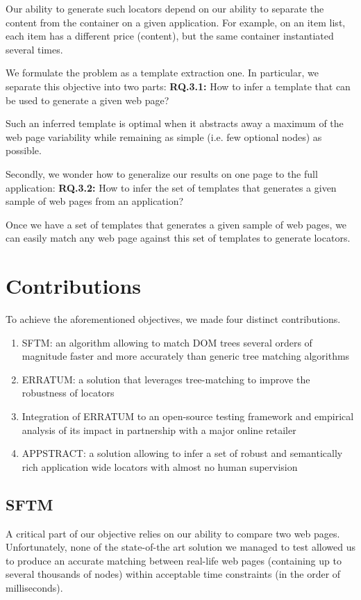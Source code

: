 Our ability to generate such locators depend on our ability to separate the content from the container on a given application. For example, on an item list, each item has a different price (content), but the same container instantiated several times.

We formulate the problem as a template extraction one.
In particular, we separate this objective into two parts:
\textbf{RQ.3.1:} How to infer a template that can be used to generate a given web page?

Such an inferred template is optimal when it abstracts away a maximum of the web page variability while remaining as simple (i.e. few optional nodes) as possible. 

Secondly, we wonder how to generalize our results on one page to the full application:
\textbf{RQ.3.2:} How to infer the set of templates that generates a given sample of web pages from an application?

Once we have a set of templates that generates a given sample of web pages, we can easily match any web page against this set of templates to generate locators.

\section{Contributions}
To achieve the aforementioned objectives, we made four distinct contributions.

\begin{enumerate}
\item SFTM: an algorithm allowing to match DOM trees several orders of magnitude faster and more accurately than generic tree matching algorithms
\item ERRATUM: a solution that leverages tree-matching to improve the robustness of locators
\item Integration of ERRATUM to an open-source testing framework and empirical analysis of its impact in partnership with a major online retailer
\item APPSTRACT: a solution allowing to infer a set of robust and semantically rich application wide locators with almost no human supervision
\end{enumerate}

\subsection{SFTM}
A critical part of our objective relies on our ability to compare two web pages. Unfortunately, none of the state-of-the art solution we managed to test allowed us to produce an accurate matching between real-life web pages (containing up to several thousands of nodes) within acceptable time constraints (in the order of milliseconds).

